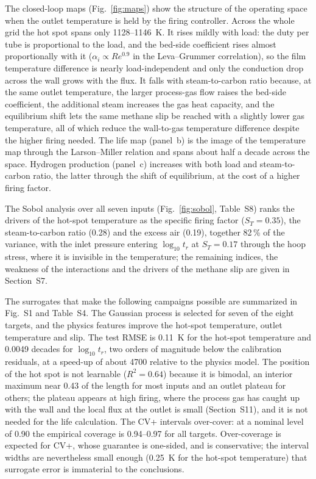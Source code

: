 \documentclass[final,3p,times]{elsarticle}
\begin{document}
The closed-loop maps (Fig.~\ref{fig:maps}) show the structure of the operating space when the outlet temperature is held by the firing controller. Across the whole grid the hot spot spans only 1128--1146~K. It rises mildly with load: the duty per tube is proportional to the load, and the bed-side coefficient rises almost proportionally with it ($\alpha_i \propto Re^{0.9}$ in the Leva--Grummer correlation), so the film temperature difference is nearly load-independent and only the conduction drop across the wall grows with the flux. It falls with steam-to-carbon ratio because, at the same outlet temperature, the larger process-gas flow raises the bed-side coefficient, the additional steam increases the gas heat capacity, and the equilibrium shift lets the same methane slip be reached with a slightly lower gas temperature, all of which reduce the wall-to-gas temperature difference despite the higher firing needed. The life map (panel~b) is the image of the temperature map through the Larson--Miller relation and spans about half a decade across the space. Hydrogen production (panel~c) increases with both load and steam-to-carbon ratio, the latter through the shift of equilibrium, at the cost of a higher firing factor.

The Sobol analysis over all seven inputs (Fig.~\ref{fig:sobol}, Table~S8) ranks the drivers of the hot-spot temperature as the specific firing factor ($S_T = 0.35$), the steam-to-carbon ratio (0.28) and the excess air (0.19), together 82\,\% of the variance, with the inlet pressure entering $\log_{10} t_r$ at $S_T = 0.17$ through the hoop stress, where it is invisible in the temperature; the remaining indices, the weakness of the interactions and the drivers of the methane slip are given in Section~S7.

The surrogates that make the following campaigns possible are summarized in Fig.~S1 and Table~S4. The Gaussian process is selected for seven of the eight targets, and the physics features improve the hot-spot temperature, outlet temperature and slip. The test RMSE is 0.11~K for the hot-spot temperature and 0.0049 decades for $\log_{10} t_r$, two orders of magnitude below the calibration residuals, at a speed-up of about 4700 relative to the physics model. The position of the hot spot is not learnable ($R^2 = 0.64$) because it is bimodal, an interior maximum near 0.43 of the length for most inputs and an outlet plateau for others; the plateau appears at high firing, where the process gas has caught up with the wall and the local flux at the outlet is small (Section~S11), and it is not needed for the life calculation. The CV+ intervals over-cover: at a nominal level of 0.90 the empirical coverage is 0.94--0.97 for all targets. Over-coverage is expected for CV+, whose guarantee is one-sided, and is conservative; the interval widths are nevertheless small enough (0.25~K for the hot-spot temperature) that surrogate error is immaterial to the conclusions.
\end{document}
